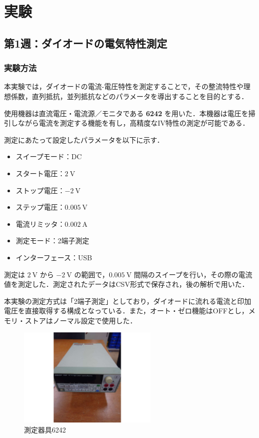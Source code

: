 \section{実験}
\subsection{第1週：ダイオードの電気特性測定}

\subsubsection*{実験方法}

本実験では，ダイオードの電流-電圧特性を測定することで，その整流特性や理想係数，直列抵抗，並列抵抗などのパラメータを導出することを目的とする．

使用機器は直流電圧・電流源／モニタである \textbf{6242} を用いた．本機器は電圧を掃引しながら電流を測定する機能を有し，高精度なIV特性の測定が可能である．

\vspace{1em}
測定にあたって設定したパラメータを以下に示す．

\begin{itemize}
    \item スイープモード：DC
    \item スタート電圧：$2~\mathrm{V}$
    \item ストップ電圧：$-2~\mathrm{V}$
    \item ステップ電圧：$0.005~\mathrm{V}$
    \item 電流リミッタ：$0.002~\mathrm{A}$
    \item 測定モード：2端子測定
    \item インターフェース：USB
\end{itemize}

測定は $2~\mathrm{V}$ から $-2~\mathrm{V}$ の範囲で，$0.005~\mathrm{V}$ 間隔のスイープを行い，その際の電流値を測定した．測定されたデータはCSV形式で保存され，後の解析で用いた．

本実験の測定方式は「2端子測定」としており，ダイオードに流れる電流と印加電圧を直接取得する構成となっている．また，オート・ゼロ機能はOFFとし，メモリ・ストアはノーマル設定で使用した．

\begin{figure}[H]
    \centering
    \includegraphics[width=0.6\textwidth]{figure/20250714_154436.pdf}
    \caption{測定器具6242}
    \label{fig:vig_param}
\end{figure}

